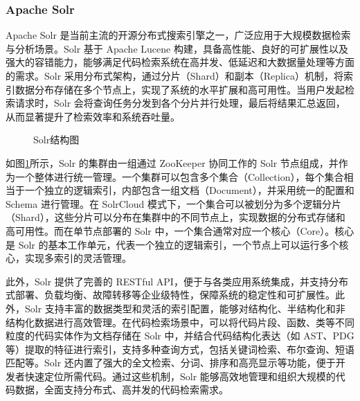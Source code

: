 \documentclass[UTF8,a4paper,12pt]{ctexart}
\numberwithin{equation}{section}
\begin{document}
\subsubsection{Apache Solr}
Apache Solr 是当前主流的开源分布式搜索引擎之一，广泛应用于大规模数据检索与分析场景。Solr 基于 Apache Lucene 构建，具备高性能、良好的可扩展性以及强大的容错能力，能够满足代码检索系统在高并发、低延迟和大数据量处理等方面的需求。Solr 采用分布式架构，通过分片（Shard）和副本（Replica）机制，将索引数据分布存储在多个节点上，实现了系统的水平扩展和高可用性。当用户发起检索请求时，Solr 会将查询任务分发到各个分片并行处理，最后将结果汇总返回，从而显著提升了检索效率和系统吞吐量。\par

\begin{figure}[H]
	\caption{Solr结构图}
	\label{solr}
\end{figure}

如图\ref{solr}所示，Solr 的集群由一组通过 ZooKeeper 协同工作的 Solr 节点组成，并作为一个整体进行统一管理。一个集群可以包含多个集合（Collection），每个集合相当于一个独立的逻辑索引，内部包含一组文档（Document），并采用统一的配置和 Schema 进行管理。在 SolrCloud 模式下，一个集合可以被划分为多个逻辑分片（Shard），这些分片可以分布在集群中的不同节点上，实现数据的分布式存储和高可用性。而在单节点部署的 Solr 中，一个集合通常对应一个核心（Core）。核心是 Solr 的基本工作单元，代表一个独立的逻辑索引，一个节点上可以运行多个核心，实现多索引的灵活管理。\par

此外，Solr 提供了完善的 RESTful API，便于与各类应用系统集成，并支持分布式部署、负载均衡、故障转移等企业级特性，保障系统的稳定性和可扩展性。此外，Solr 支持丰富的数据类型和灵活的索引配置，能够对结构化、半结构化和非结构化数据进行高效管理。在代码检索场景中，可以将代码片段、函数、类等不同粒度的代码实体作为文档存储在 Solr 中，并结合代码结构化表达（如 AST、PDG 等）提取的特征进行索引，支持多种查询方式，包括关键词检索、布尔查询、短语匹配等。Solr 还内置了强大的全文检索、分词、排序和高亮显示等功能，便于开发者快速定位所需代码。通过这些机制，Solr 能够高效地管理和组织大规模的代码数据，全面支持分布式、高并发的代码检索需求。\par
\end{document}
